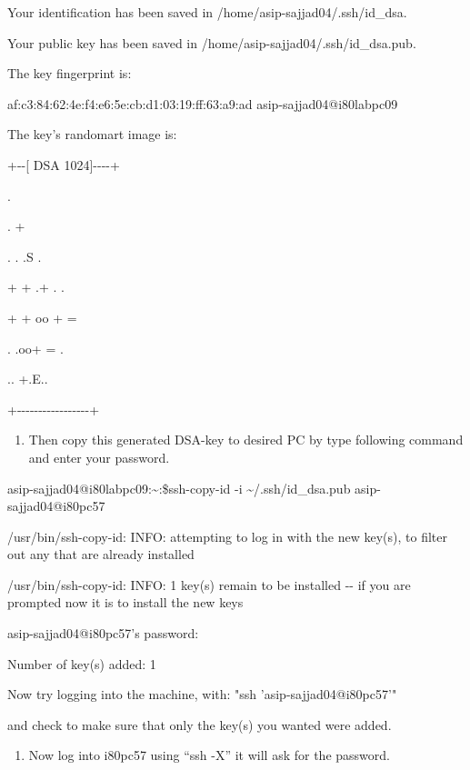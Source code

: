 \documentclass{article}
\begin{document}
Your identification has been saved in /home/asip-sajjad04/.ssh/id\_dsa.

Your public key has been saved in /home/asip-sajjad04/.ssh/id\_dsa.pub.

The key fingerprint is:

af:c3:84:62:4e:f4:e6:5e:cb:d1:03:19:ff:63:a9:ad asip-sajjad04@i80labpc09

The key's randomart image is:

+-\/-{[} DSA 1024{]}-\/-\/-\/-+

\textbar{} \textbar{}

\textbar{} \textbar{}

\textbar{} . \textbar{}

\textbar{} . + \textbar{}

\textbar{} . . .S . \textbar{}

\textbar{} + + .+ . . \textbar{}

\textbar{} + + oo + = \textbar{}

\textbar{} . .oo+ = . \textbar{}

\textbar{} .. +.E.. \textbar{}

+-\/-\/-\/-\/-\/-\/-\/-\/-\/-\/-\/-\/-\/-\/-\/-\/-+

\begin{enumerate}
\def\labelenumi{\arabic{enumi}.}
\setcounter{enumi}{10}
\item
  Then copy this generated DSA-key to desired PC by type following
  command and enter your password.
\end{enumerate}

asip-sajjad04@i80labpc09:\textasciitilde:\$ssh-copy-id -i
\textasciitilde/.ssh/id\_dsa.pub asip-sajjad04@i80pc57

/usr/bin/ssh-copy-id: INFO: attempting to log in with the new key(s), to
filter out any that are already installed

/usr/bin/ssh-copy-id: INFO: 1 key(s) remain to be installed -\/- if you
are prompted now it is to install the new keys

asip-sajjad04@i80pc57's password:

Number of key(s) added: 1

Now try logging into the machine, with: "ssh 'asip-sajjad04@i80pc57'"

and check to make sure that only the key(s) you wanted were added.

\begin{enumerate}
\def\labelenumi{\arabic{enumi}.}
\setcounter{enumi}{11}
\item
  Now log into i80pc57 using ``ssh -X'' it will ask for the password.
\end{enumerate}
\end{document}

